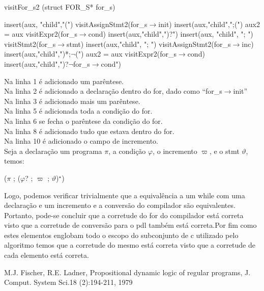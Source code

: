 \documentclass{article}
\begin{document}
	
	\begin{algorithm}
		
		\caption{visitFor\_s2 (struct FOR\_S* for\_s)}
		insert(aux, "child","(")\;
		visitAssignStmt2(for\_s$\rightarrow$init)\;
		insert(aux,"child",";(")\;
		aux2 = aux\;
		visitExpr2(for\_s$\rightarrow$cond)\;
		insert(aux,"child",")?")\;
		insert(aux, "child", "; ")\;
		visitStmt2(for\_s$\rightarrow$stmt)\;
		insert(aux,"child", "; ")\;
		visitAssignStmt2(for\_s$\rightarrow$inc)\;
		insert(aux,"child",")*;$\neg$(")\;
		aux2 = aux\;
		visitExpr2(for\_s$\rightarrow$cond)\;
		insert(aux,"child",")?$\neg$for\_s$\rightarrow$cond")\;
	\end{algorithm}
	\begin{flushleft}
	Na linha 1 é adicionado um parêntese.\\
	Na linha 2 é adicionado a declaração dentro do for, dado como “for\_s$\rightarrow$init”\\
	Na linha 3 é adicionado mais um parêntese.\\
	Na linha 5 é adicionada toda a condição do for.\\
	Na linha 6 se fecha o parêntese da condição do for.\\
	Na linha 8 é adicionado tudo que estava dentro do for.\\
	Na linha 10 é adicionado o campo de incremento.\\
	
	Seja a declaração um programa $\pi$, a condição $\varphi$, o incremento $\varpi$, e o stmt $\vartheta$, temos:
	
	($\pi$ ; ($\varphi$? ; $\varpi$ ; $\vartheta$)$^\star$)
		\end{flushleft}
	\vspace{25mm}
	Logo, podemos verificar trivialmente que a equivalência a um while com uma declaração e um incremento e a conversão do compilador são equivalentes. Portanto, pode-se concluir que a corretude do for do compilador está correta visto que a corretude de conversão para o pdl também está correta.Por fim como estes elementos englobam todo o escopo do subconjunto de c utilizado pelo algoritmo temos que a corretude do mesmo está correta visto que a corretude de cada elemento está correta.\\
	

	\begin{thebibliography}{00}

		M.J. Fischer, R.E. Ladner, Propositional dynamic logic of regular programs, J. Comput. System Sci.18 (2):194-211, 1979
		
	\end{thebibliography}
\end{document}

